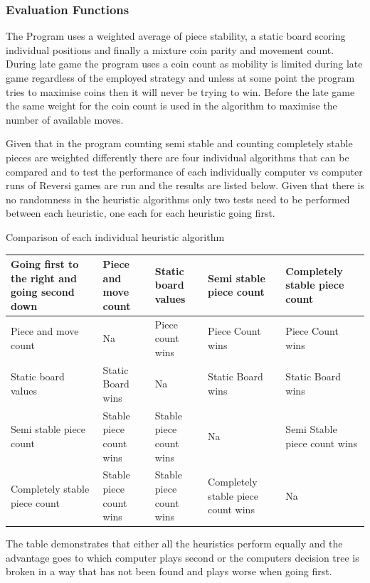 \documentclass[final]{cmpreport}
\begin{document}
\subsubsection{Evaluation Functions}\label{evalrefs}
The Program uses a weighted average of piece stability, a static board scoring individual positions and finally a mixture coin parity and movement count. During late game the program uses a coin count as mobility is limited during late game regardless of the employed strategy and unless at some point the program tries to maximise coins then it will never be trying to win. Before the late game the same weight for the coin count is used in the algorithm to maximise the number of available moves.

Given that in the program counting semi stable and counting completely stable pieces are weighted differently there are four individual algorithms that can be compared and to test the performance of each individually computer vs computer runs of Reversi games are run and the results are listed below. Given that there is no randomness in the heuristic algorithms only two tests need to be performed between each heuristic, one each for each heuristic going first.


\begin{cmptable}[htb]{Comparison of each individual heuristic algorithm}
	\begin{tabular}{|p{3cm}|p{3cm}|p{3cm}|p{3cm}|p{3cm}|}
		\hline
		 Going first to the right and going second down & Piece and move count & Static board values & Semi stable piece count & Completely stable piece count \\ \hline
		Piece and move count & Na & Piece count wins & Piece Count wins & Piece Count wins\\ \hline 
		Static board values & Static Board wins & Na & Static Board wins & Static Board wins\\ \hline 
		Semi stable piece count & Stable piece count wins & Stable piece count wins & Na & Semi Stable piece count wins \\ \hline 
		Completely stable piece count & Stable piece count wins & Stable piece count wins & Completely stable piece count wins & Na\\ \hline 
		
	\end{tabular}
\end{cmptable}
\FloatBarrier
The table demonstrates that either all the heuristics perform equally and the advantage goes to which computer plays second or the computers decision tree is broken in a way that has not been found and plays worse when going first.
\end{document}
